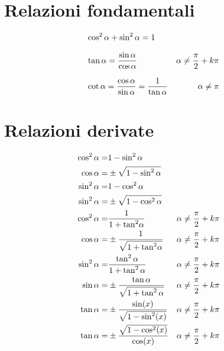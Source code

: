 \section{Relazioni fondamentali}
\begin{align*}	
	&\cos^{2}\alpha+\sin^{2}\alpha=1\\[.25cm]\index{Goniometria!relazione!fondamentale}
	&\tan\alpha={}\dfrac{\sin\alpha}{\cos\alpha}&\alpha\neq\dfrac{\pi}{2}+k\pi\\[.25cm]\index{Tangente!definizione}
	&\cot\alpha={}\dfrac{\cos\alpha}{\sin\alpha}={}\dfrac{1}{\tan\alpha}&\alpha\neq\pi\index{Cotangente!definizione}
\end{align*}
\section{Relazioni derivate}
\begin{align*}
\cos^{2}\alpha=&{}1-\sin^{2}\alpha\\\index{Coseno!dato seno}
\cos\alpha=&{}\pm\sqrt{1-\sin^{2}\alpha}\\
\sin^{2}\alpha=&{}1-\cos^{2}\alpha \\\index{Seno!dato coseno}
\sin^{2}\alpha=&{}\pm\sqrt{1-\cos^{2}\alpha}\\
\cos^{2}\alpha=&{}\dfrac{1}{1+{\tan}^{2}\alpha} &&\alpha\neq\dfrac{\pi}{2}+k\pi\\
\cos\alpha=&{}\pm\dfrac{1}{\sqrt{1+{\tan}^{2}\alpha}} &&\alpha\neq\dfrac{\pi}{2}+k\pi\\\index{Coseno!dato tangente}
\sin^{2}\alpha=&{}\dfrac{\tan^{2}\alpha}{1+\tan^{2}\alpha}&&\alpha\neq\dfrac{\pi}{2}+k\pi\\
\sin\alpha=&{}\pm\dfrac{\tan\alpha}{\sqrt{1+\tan^{2}\alpha}}&&\alpha\neq\dfrac{\pi}{2}+k\pi\\\index{Seno!dato tangente}
\tan\alpha=&{}\pm\dfrac{\sin(x)}{\sqrt{1-\sin^2(x)}}&&\alpha\neq\dfrac{\pi}{2}+k\pi\\\index{Tangente!dato seno}
\tan\alpha=&{}\pm\dfrac{\sqrt{1-\cos^2(x)}}{\cos(x)}
&&\alpha\neq\dfrac{\pi}{2}+k\pi\index{Tangente!dato coseno}
\end{align*}
